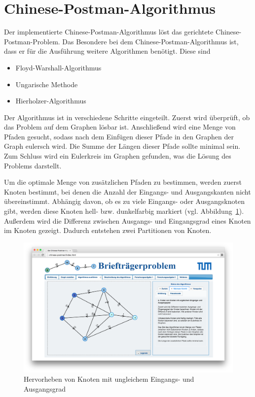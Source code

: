 \section{Chinese-Postman-Algorithmus} %
Der implementierte Chinese-Postman-Algorithmus löst das gerichtete Chinese-Postman-Problem. 
Das Besondere bei dem Chinese-Postman-Algorithmus ist, dass er für die Ausführung weitere Algorithmen benötigt. Diese sind 
\begin{itemize}
\item Floyd-Warshall-Algorithmus
\item Ungarische Methode
\item Hierholzer-Algorithmus
\end{itemize}
Der Algorithmus ist in verschiedene Schritte eingeteilt. Zuerst wird überprüft, ob das Problem auf dem Graphen lösbar ist. Anschließend wird eine Menge von Pfaden gesucht, sodass nach dem Einfügen dieser Pfade in den Graphen der Graph eulersch wird. Die Summe der Längen dieser Pfade sollte minimal sein.
Zum Schluss wird ein Eulerkreis im Graphen gefunden, was die Lösung des Problems darstellt.

Um die optimale Menge von zusätzlichen Pfaden zu bestimmen, werden zuerst Knoten bestimmt, bei denen die Anzahl der Eingangs- und Ausgangskanten nicht übereinstimmt.
Abhängig davon, ob es zu viele Eingangs- oder Ausgangsknoten gibt, werden diese Knoten hell- bzw. dunkelfarbig markiert (vgl. Abbildung~\ref{fig:postman_unbalanced}). Außerdem wird die Differenz zwischen Ausgangs- und Eingangsgrad eines Knoten im Knoten gezeigt. Dadurch entstehen zwei Partitionen von Knoten. 

\begin{figure}[h!]
	\centering
	\includegraphics[width=\textwidth]{figures/postman_unbalanced}
	\caption[Chinese-Postman: Unbalancierte Knoten]{Hervorheben von Knoten mit ungleichem Eingangs- und Ausgangsgrad}\label{fig:postman_unbalanced}
\end{figure}

